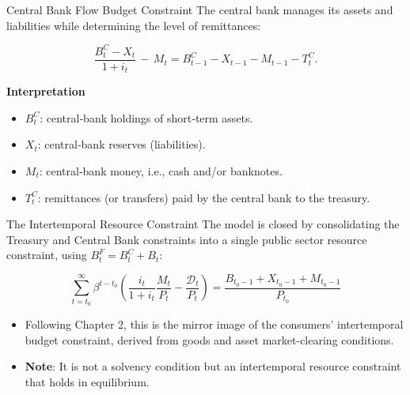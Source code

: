 \documentclass[11pt,aspectratio=169]{beamer}
\begin{document}
\begin{frame}{Central Bank Flow Budget Constraint}
\small
The central bank manages its assets and liabilities while determining the level of remittances:

\begin{equation}
\frac{B_t^{C}-X_t}{1+i_t}\,-\,M_t = B_{t-1}^{C} - X_{t-1} - M_{t-1} - T_t^{C}.
\label{FlowBCI}
\end{equation}

\vspace{0.4cm}
\textbf{Interpretation}
\begin{itemize}
    \item \(B_t^{C}\): central‑bank holdings of short‑term assets.
    \item \(X_t\): central‑bank reserves (liabilities).
    \item \(M_t\): central‑bank money, i.e., cash and/or banknotes.
    \item \(T_t^C\): remittances (or transfers) paid by the central bank to the treasury.
\end{itemize}
\end{frame}
\begin{frame}{The Intertemporal Resource Constraint}
\small
The model is closed by consolidating the Treasury and Central Bank constraints into a single public sector resource constraint, using $B_t^F = B_t^C +B_t$:

\begin{equation}
\sum_{t=t_{0}}^{\infty }\beta ^{t-t_{0}}\left( \frac{i_{t}}{1+i_{t}}\frac{M_{t}}{P_{t}}-\frac{\mathcal{D}_{t}}{P_{t}}\right) = \frac{B_{t_{0}-1} + X_{t_{0}-1} + M_{t_{0}-1}}{P_{t_{0}}} \label{IBC-I}
\end{equation}
\vspace{0.4em}
\begin{itemize}
    \item Following Chapter 2, this is the mirror image of the consumers' intertemporal budget constraint, derived from goods and asset market-clearing conditions.
    \item \textbf{Note}: It is not a solvency condition but an intertemporal resource constraint that holds in equilibrium.
\end{itemize}
\end{frame}
\end{document}
